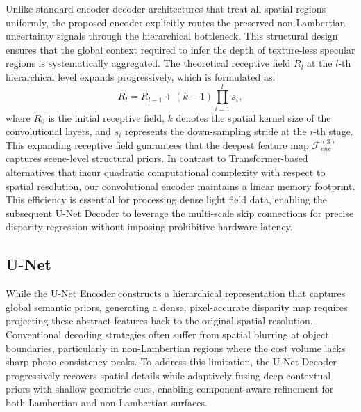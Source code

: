 \documentclass[lettersize,journal]{IEEEtran}
\begin{document}
Unlike standard encoder-decoder architectures \cite{ronneberger2015} that treat all spatial regions uniformly, the proposed encoder explicitly routes the preserved non-Lambertian uncertainty signals through the hierarchical bottleneck. This structural design ensures that the global context required to infer the depth of texture-less specular regions is systematically aggregated. The theoretical receptive field $R_l$ at the $l$-th hierarchical level expands progressively, which is formulated as:
\begin{equation}
R_l = R_{l-1} + (k - 1) \prod_{i=1}^{l} s_i,
\end{equation}
where $R_0$ is the initial receptive field, $k$ denotes the spatial kernel size of the convolutional layers, and $s_i$ represents the down-sampling stride at the $i$-th stage. This expanding receptive field guarantees that the deepest feature map $\mathcal{F}_{enc}^{(3)}$ captures scene-level structural priors. In contrast to Transformer-based alternatives \cite{liu2021, dosovitskiy2021} that incur quadratic computational complexity with respect to spatial resolution, our convolutional encoder maintains a linear memory footprint. This efficiency is essential for processing dense light field data, enabling the subsequent U-Net Decoder to leverage the multi-scale skip connections for precise disparity regression without imposing prohibitive hardware latency.

\subsection{U-Net}

While the U-Net Encoder constructs a hierarchical representation that captures global semantic priors, generating a dense, pixel-accurate disparity map requires projecting these abstract features back to the original spatial resolution. Conventional decoding strategies \cite{eigen2014, ronneberger2015} often suffer from spatial blurring at object boundaries, particularly in non-Lambertian regions where the cost volume lacks sharp photo-consistency peaks. To address this limitation, the U-Net Decoder progressively recovers spatial details while adaptively fusing deep contextual priors with shallow geometric cues, enabling component-aware refinement for both Lambertian and non-Lambertian surfaces.
\end{document}
